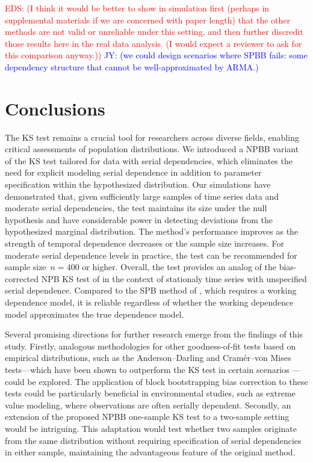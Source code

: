 \documentclass[APA,Times1COL]{WileyNJDv5} %
\newcommand{\jy}[1]{\textcolor{blue}{JY: (#1)}}
\newcommand{\eds}[1]{\textcolor{red}{EDS: (#1)}}
\begin{document}
\eds{I think it would be better to show in simulation first (perhaps 
in supplemental materials if we are concerned with paper length) that the other
methods are not valid or unreliable under this setting, and then 
further discredit those results here in the real data analysis.
(I would expect a reviewer to ask for this comparison anyway.)}
\jy{we could design scenarios where SPBB fails: some dependency
  structure that cannot be well-approximated by ARMA.}


\section{Conclusions}\label{sec:conclusion}

The KS test remains a crucial tool for researchers across diverse fields,
enabling critical assessments of population distributions. We introduced a
NPBB variant of the KS test tailored for data with
serial dependencies, which eliminates the need for explicit modeling serial
dependence in addition to parameter specification within the hypothesized
distribution. Our simulations have demonstrated that, given
sufficiently large samples of time series data and moderate serial dependencies,
the test maintains its size under the null hypothesis and have considerable
power in detecting deviations from the hypothesized marginal distribution. The
method's performance improves as the strength of temporal dependence decreases
or the sample size increases. For moderate serial dependence levels in practice,
the test can be recommended for sample size~$n = 400$ or higher.
Overall, the test provides an analog of the bias-corrected NPB KS test of 
\citet{babu2004goodness} in the context of stationaly time
series with unspecified serial dependence. Compared to the SPB method
of \citet{zeimbekakis2022misuses}, which requires a working dependence model, it
is reliable regardless of whether the working dependence model approximates the
true dependence model.


Several promising directions for further research emerge from the findings of
this study. Firstly, analogous methodologies for other goodness-of-fit tests
based on empirical distributions, such as the Anderson--Darling and Cramér--von
Mises tests---which have been shown to outperform the KS test in certain scenarios
\citep{stephens2017tests}---could be explored. The application of block
bootstrapping bias correction to these tests could be particularly beneficial in
environmental studies, such as extreme value modeling, where observations are
often serially dependent. Secondly, an extension of the proposed NPBB
one-sample KS test to a two-sample setting would be
intriguing. This adaptation would test whether two samples originate from the
same distribution without requiring specification of serial dependencies in
either sample, maintaining the advantageous feature of the original method.
\end{document}
